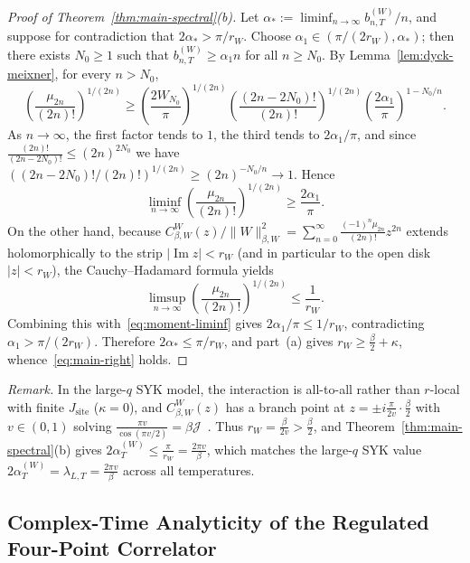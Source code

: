 \documentclass[11pt,a4paper]{article}
\numberwithin{equation}{section}
\theoremstyle{plain}
\theoremstyle{definition}
\begin{document}
\begin{proof}[Proof of Theorem~\ref{thm:main-spectral}(b)]
Let $\alpha_* := \liminf_{n\to\infty} b_{n,T}^{(W)}/n$, and suppose for contradiction that $2\alpha_* > \pi/r_W$. Choose $\alpha_1\in(\pi/(2r_W), \alpha_*)$; then there exists $N_0\ge 1$ such that $b_{n,T}^{(W)} \ge \alpha_1 n$ for all $n\ge N_0$. By Lemma~\ref{lem:dyck-meixner}, for every $n > N_0$,
\[
  \left(\frac{\mu_{2n}}{(2n)!}\right)^{1/(2n)}
  \ge \left(\frac{2W_{N_0}}{\pi}\right)^{1/(2n)} \left(\frac{(2n-2N_0)!}{(2n)!}\right)^{1/(2n)} \left(\frac{2\alpha_1}{\pi}\right)^{1 - N_0/n}.
\]
As $n\to\infty$, the first factor tends to $1$, the third tends to $2\alpha_1/\pi$, and since $\frac{(2n)!}{(2n-2N_0)!} \le (2n)^{2N_0}$ we have $((2n-2N_0)!/(2n)!)^{1/(2n)} \ge (2n)^{-N_0/n} \to 1$. Hence
\begin{equation}\label{eq:moment-liminf}
  \liminf_{n\to\infty}\left(\frac{\mu_{2n}}{(2n)!}\right)^{1/(2n)} \ge \frac{2\alpha_1}{\pi}.
\end{equation}
On the other hand, because $C_{\beta,W}^W(z)/\|W\|_{\beta,W}^2 = \sum_{n=0}^\infty \frac{(-1)^n \mu_{2n}}{(2n)!} z^{2n}$ extends holomorphically to the strip $|\operatorname{Im}z| < r_W$ (and in particular to the open disk $|z| < r_W$), the Cauchy--Hadamard formula yields
\[
  \limsup_{n\to\infty}\left(\frac{\mu_{2n}}{(2n)!}\right)^{1/(2n)} \le \frac{1}{r_W}.
\]
Combining this with~\eqref{eq:moment-liminf} gives $2\alpha_1/\pi \le 1/r_W$, contradicting $\alpha_1 > \pi/(2r_W)$. Therefore $2\alpha_* \le \pi/r_W$, and part~(a) gives $r_W \ge \frac{\beta}{2}+\kappa$, whence~\eqref{eq:main-right} holds.
\end{proof}

\noindent\emph{Remark.}
In the large-$q$ SYK model, the interaction is all-to-all rather than $r$-local with finite $J_{\mathrm{site}}$ ($\kappa = 0$), and $C_{\beta,W}^W(z)$ has a branch point at $z = \pm i\frac{\pi}{2v}\cdot\frac{\beta}{2}$ with $v\in(0,1)$ solving $\frac{\pi v}{\cos(\pi v/2)} = \beta\mathcal{J}$~\cite{MS2016,Parker2019}. Thus $r_W = \frac{\beta}{2v} > \frac{\beta}{2}$, and Theorem~\ref{thm:main-spectral}(b) gives $2\alpha_T^{(W)} \le \frac{\pi}{r_W} = \frac{2\pi v}{\beta}$, which matches the large-$q$ SYK value $2\alpha_T^{(W)} = \lambda_{L,T} = \frac{2\pi v}{\beta}$ across all temperatures.

\subsection{Complex-Time Analyticity of the Regulated Four-Point Correlator}\label{subsec:otoc-strip}
\end{document}
